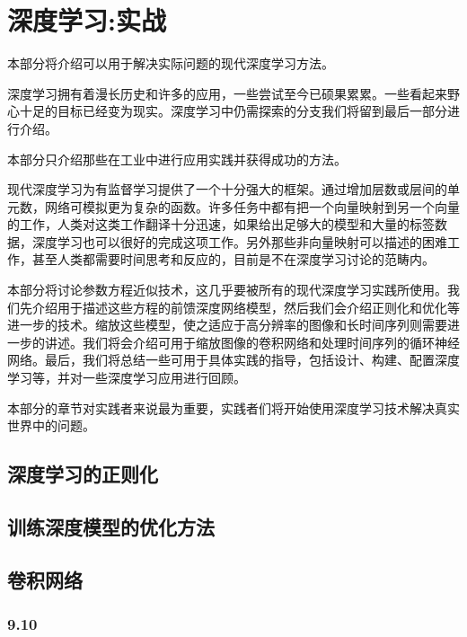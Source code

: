 \documentclass[a4paper,11pt]{book}
\begin{document}
\part{深度学习:实战}
\label{part:2}

本部分将介绍可以用于解决实际问题的现代深度学习方法。


深度学习拥有着漫长历史和许多的应用，一些尝试至今已硕果累累。一些看起来野心十足的目标已经变为现实。深度学习中仍需探索的分支我们将留到最后一部分进行介绍。


本部分只介绍那些在工业中进行应用实践并获得成功的方法。


现代深度学习为有监督学习提供了一个十分强大的框架。通过增加层数或层间的单元数，网络可模拟更为复杂的函数。许多任务中都有把一个向量映射到另一个向量的工作，人类对这类工作翻译十分迅速，如果给出足够大的模型和大量的标签数据，深度学习也可以很好的完成这项工作。另外那些非向量映射可以描述的困难工作，甚至人类都需要时间思考和反应的，目前是不在深度学习讨论的范畴内。


本部分将讨论参数方程近似技术，这几乎要被所有的现代深度学习实践所使用。我们先介绍用于描述这些方程的前馈深度网络模型，然后我们会介绍正则化和优化等进一步的技术。缩放这些模型，使之适应于高分辨率的图像和长时间序列则需要进一步的讲述。我们将会介绍可用于缩放图像的卷积网络和处理时间序列的循环神经网络。最后，我们将总结一些可用于具体实践的指导，包括设计、构建、配置深度学习等，并对一些深度学习应用进行回顾。


本部分的章节对实践者来说最为重要，实践者们将开始使用深度学习技术解决真实世界中的问题。





\chapter{深度学习的正则化}
\label{chap:7}

\chapter{训练深度模型的优化方法}
\label{chap:8}

\chapter{卷积网络}
\label{chap:9}


\section{9.10}
\label{sec:9.10}
\end{document}
